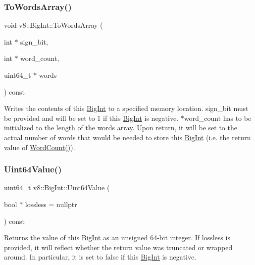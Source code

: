 \subsubsection{\texorpdfstring{To\+Words\+Array()}{ToWordsArray()}}
{\footnotesize\ttfamily void v8\+::\+Big\+Int\+::\+To\+Words\+Array (\begin{DoxyParamCaption}\item[{int $\ast$}]{sign\+\_\+bit,  }\item[{int $\ast$}]{word\+\_\+count,  }\item[{uint64\+\_\+t $\ast$}]{words }\end{DoxyParamCaption}) const}

Writes the contents of this \mbox{\hyperlink{classv8_1_1BigInt}{Big\+Int}} to a specified memory location. {\ttfamily sign\+\_\+bit} must be provided and will be set to 1 if this \mbox{\hyperlink{classv8_1_1BigInt}{Big\+Int}} is negative. {\ttfamily $\ast$word\+\_\+count} has to be initialized to the length of the {\ttfamily words} array. Upon return, it will be set to the actual number of words that would be needed to store this \mbox{\hyperlink{classv8_1_1BigInt}{Big\+Int}} (i.\+e. the return value of {\ttfamily \mbox{\hyperlink{classv8_1_1BigInt_a840783db8ae94178040c5a8a7bb52875}{Word\+Count()}}}). \mbox{\label{classv8_1_1BigInt_a32d8d340aef40da93cde35a9baf7e58d}} 
\subsubsection{\texorpdfstring{Uint64\+Value()}{Uint64Value()}}
{\footnotesize\ttfamily uint64\+\_\+t v8\+::\+Big\+Int\+::\+Uint64\+Value (\begin{DoxyParamCaption}\item[{bool $\ast$}]{lossless = {\ttfamily nullptr} }\end{DoxyParamCaption}) const}

Returns the value of this \mbox{\hyperlink{classv8_1_1BigInt}{Big\+Int}} as an unsigned 64-\/bit integer. If {\ttfamily lossless} is provided, it will reflect whether the return value was truncated or wrapped around. In particular, it is set to {\ttfamily false} if this \mbox{\hyperlink{classv8_1_1BigInt}{Big\+Int}} is negative. \mbox{\label{classv8_1_1BigInt_a840783db8ae94178040c5a8a7bb52875}} 
